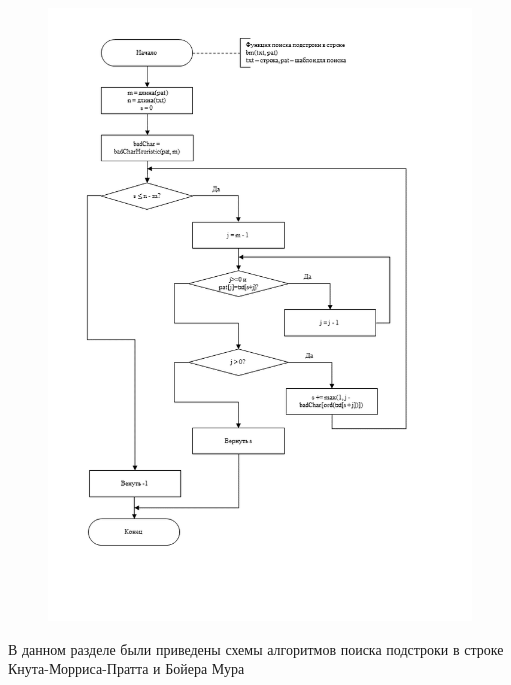\documentclass[../main.tex]{subfiles}
\begin{document}
	\begin{figure}[H]
		\centering
		\includegraphics[scale=0.7]{src/img/bm-main}
		\caption{}
		\label{fig:bm-main}
	\end{figure}
	
	В данном разделе были приведены схемы алгоритмов поиска подстроки в строке Кнута-Морриса-Пратта и Бойера Мура
	
\end{document}
